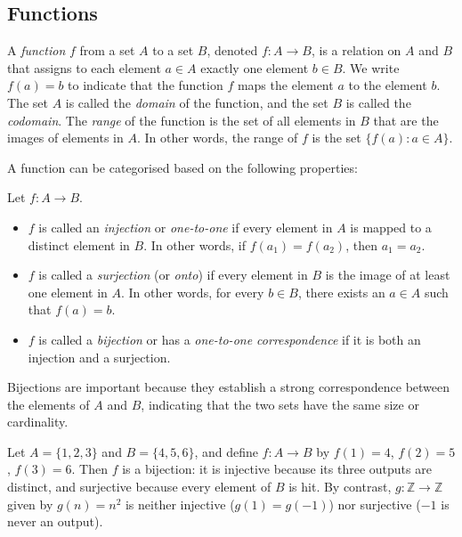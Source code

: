 \subsection{Functions}

\begin{definition}
A \textit{function} $f$ from a set $A$ to a set $B$, denoted $f : A \to B$, is a relation on $A$ and $B$ that assigns to each element $a \in A$ exactly one element $b \in B$. We write $f(a) = b$ to indicate that the function $f$ maps the element $a$ to the element $b$. The set $A$ is called the \textit{domain} of the function, and the set $B$ is called the \textit{codomain}. The \textit{range} of the function is the set of all elements in $B$ that are the images of elements in $A$. In other words, the range of $f$ is the set $\{f(a) : a \in A\}$.
\end{definition}

A function can be categorised based on the following properties:

\begin{definition}
Let $f : A \to B$.
\begin{itemize}
    \item $f$ is called an \textit{injection} or \textit{one-to-one} if every element in $A$ is mapped to a distinct element in $B$. In other words, if $f(a_1) = f(a_2)$, then $a_1 = a_2$.

    \item $f$ is called a \textit{surjection} (or \textit{onto}) if every element in $B$ is the image of at least one element in $A$. In other words, for every $b \in B$, there exists an $a \in A$ such that $f(a) = b$.

    \item $f$ is called a \textit{bijection} or has a \textit{one-to-one correspondence} if it is both an injection and a surjection.
\end{itemize}
\end{definition}

Bijections are important because they establish a strong correspondence between the elements of $A$ and $B$, indicating that the two sets have the same size or cardinality.

\begin{example}
Let $A = \{1, 2, 3\}$ and $B = \{4, 5, 6\}$, and define $f : A \to B$ by $f(1) = 4$, $f(2) = 5$, $f(3) = 6$. Then $f$ is a bijection: it is injective because its three outputs are distinct, and surjective because every element of $B$ is hit. By contrast, $g : \mathbb{Z} \to \mathbb{Z}$ given by $g(n) = n^2$ is neither injective ($g(1) = g(-1)$) nor surjective ($-1$ is never an output).
\end{example}

